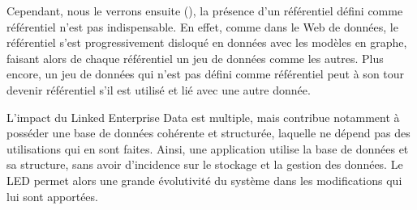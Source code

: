 Cependant, nous le verrons ensuite (), la présence d'un référentiel défini comme référentiel n'est pas indispensable. En effet, comme dans le Web de données, le référentiel s'est progressivement disloqué en données avec les modèles en graphe, faisant alors de chaque référentiel un jeu de données comme les autres. Plus encore, un jeu de données qui n'est pas défini comme référentiel peut à son tour devenir référentiel s'il est utilisé et lié avec une autre donnée.

\bigskip
\bigskip

L'impact du Linked Enterprise Data est multiple, mais contribue notamment à posséder une base de données cohérente et structurée, laquelle ne dépend pas des utilisations qui en sont faites. Ainsi, une application utilise la base de données et sa structure, sans avoir d'incidence sur le stockage et la gestion des données. Le LED permet alors une grande évolutivité du système dans les modifications qui lui sont apportées.